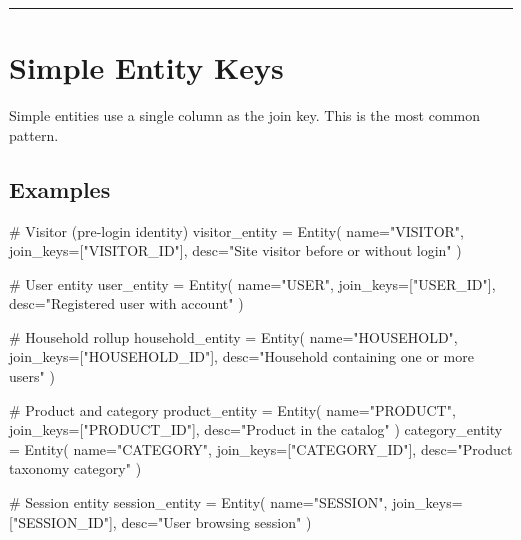 \documentclass[
  letterpaper,
  DIV=11,
  numbers=noendperiod]{scrreprt}
\newenvironment{Shaded}{\begin{snugshade}}{\end{snugshade}}
\newcommand{\CommentTok}[1]{\textcolor[rgb]{0.37,0.37,0.37}{#1}}
\newcommand{\NormalTok}[1]{\textcolor[rgb]{0.00,0.23,0.31}{#1}}
\newcommand{\OperatorTok}[1]{\textcolor[rgb]{0.37,0.37,0.37}{#1}}
\newcommand{\StringTok}[1]{\textcolor[rgb]{0.13,0.47,0.30}{#1}}
\begin{document}
\begin{center}\rule{0.5\linewidth}{0.5pt}\end{center}

\hypertarget{simple-entity-keys}{%
\section{Simple Entity Keys}\label{simple-entity-keys}}

Simple entities use a single column as the join key. This is the most
common pattern.

\hypertarget{examples}{%
\subsection{Examples}\label{examples}}

\begin{Shaded}
\begin{Highlighting}[]
\CommentTok{\# Visitor (pre{-}login identity)}
\NormalTok{visitor\_entity }\OperatorTok{=}\NormalTok{ Entity(}
\NormalTok{    name}\OperatorTok{=}\StringTok{"VISITOR"}\NormalTok{,}
\NormalTok{    join\_keys}\OperatorTok{=}\NormalTok{[}\StringTok{"VISITOR\_ID"}\NormalTok{],}
\NormalTok{    desc}\OperatorTok{=}\StringTok{"Site visitor before or without login"}
\NormalTok{)}

\CommentTok{\# User entity}
\NormalTok{user\_entity }\OperatorTok{=}\NormalTok{ Entity(}
\NormalTok{    name}\OperatorTok{=}\StringTok{"USER"}\NormalTok{,}
\NormalTok{    join\_keys}\OperatorTok{=}\NormalTok{[}\StringTok{"USER\_ID"}\NormalTok{],}
\NormalTok{    desc}\OperatorTok{=}\StringTok{"Registered user with account"}
\NormalTok{)}

\CommentTok{\# Household rollup}
\NormalTok{household\_entity }\OperatorTok{=}\NormalTok{ Entity(}
\NormalTok{    name}\OperatorTok{=}\StringTok{"HOUSEHOLD"}\NormalTok{,}
\NormalTok{    join\_keys}\OperatorTok{=}\NormalTok{[}\StringTok{"HOUSEHOLD\_ID"}\NormalTok{],}
\NormalTok{    desc}\OperatorTok{=}\StringTok{"Household containing one or more users"}
\NormalTok{)}

\CommentTok{\# Product and category}
\NormalTok{product\_entity }\OperatorTok{=}\NormalTok{ Entity(}
\NormalTok{    name}\OperatorTok{=}\StringTok{"PRODUCT"}\NormalTok{,}
\NormalTok{    join\_keys}\OperatorTok{=}\NormalTok{[}\StringTok{"PRODUCT\_ID"}\NormalTok{],}
\NormalTok{    desc}\OperatorTok{=}\StringTok{"Product in the catalog"}
\NormalTok{)}
\NormalTok{category\_entity }\OperatorTok{=}\NormalTok{ Entity(}
\NormalTok{    name}\OperatorTok{=}\StringTok{"CATEGORY"}\NormalTok{,}
\NormalTok{    join\_keys}\OperatorTok{=}\NormalTok{[}\StringTok{"CATEGORY\_ID"}\NormalTok{],}
\NormalTok{    desc}\OperatorTok{=}\StringTok{"Product taxonomy category"}
\NormalTok{)}

\CommentTok{\# Session entity}
\NormalTok{session\_entity }\OperatorTok{=}\NormalTok{ Entity(}
\NormalTok{    name}\OperatorTok{=}\StringTok{"SESSION"}\NormalTok{,}
\NormalTok{    join\_keys}\OperatorTok{=}\NormalTok{[}\StringTok{"SESSION\_ID"}\NormalTok{],}
\NormalTok{    desc}\OperatorTok{=}\StringTok{"User browsing session"}
\NormalTok{)}
\end{Highlighting}
\end{Shaded}
\end{document}
